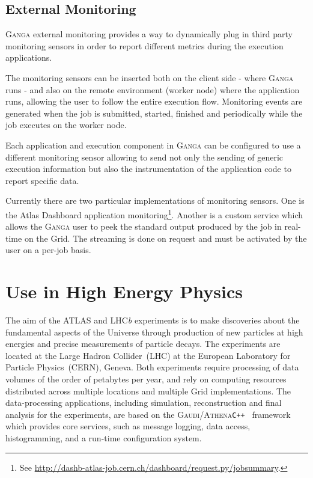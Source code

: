\documentclass{elsart}
\def\lhcb {LHC{\em b\/}\xspace}
\def\atlas {ATLAS\xspace}
\def\lhc {LHC\xspace}
\def\ganga {\textsc{Ganga}\xspace}
\def\gaudi {\textsc{Gaudi}\xspace}
\def\athena {\textsc{Athena}\xspace}
\def\grid {Grid\xspace}
\newcommand{\code}[1]{\texttt{#1}}
\begin{document}
\subsection{External Monitoring}
\label{sec:ExternalMonitoring}
\ganga external monitoring provides a way to dynamically plug in third party
monitoring sensors in order to report different metrics during the execution
applications. 

The monitoring sensors can be inserted both on the client side - where \ganga
runs - and also on the remote environment (worker node) where the application
runs, allowing the user to follow the entire execution flow.  Monitoring
events are generated when the job is submitted, started, finished and
periodically while the job executes on the worker node.

Each application and execution component in \ganga can be configured to use a
different monitoring sensor allowing to send not only the sending of generic execution
information but also the instrumentation of the application code to report
specific data.

Currently there are two particular implementations of monitoring sensors. One
is the Atlas Dashboard application monitoring\footnote{See
  \url{http://dashb-atlas-job.cern.ch/dashboard/request.py/jobsummary}.}.
Another is a custom service which allows the \ganga user to peek the standard
output produced by the job in real-time on the \grid. The streaming is done on
request and must be activated by the user on a per-job basis.

\section{Use in High Energy Physics}
\label{sec:useHEP}

The aim of the \atlas and \lhcb experiments is to make discoveries about the
fundamental aspects of the Universe through production of new particles at 
high energies and precise measurements of particle decays. The experiments
are located at the Large Hadron Collider~(\lhc) at the European Laboratory for
Particle Physics~(CERN), Geneva. Both experiments require processing of data
volumes of the order of petabytes per year, and rely on computing resources
distributed across multiple locations and multiple Grid implementations. The data-processing applications,
including simulation, reconstruction and final analysis for the experiments,
are based on the \gaudi/\athena \code{C++}~\cite{gaudi} framework which
provides core services, such as message logging, data access, histogramming,
and a run-time configuration system. 
\end{document}
